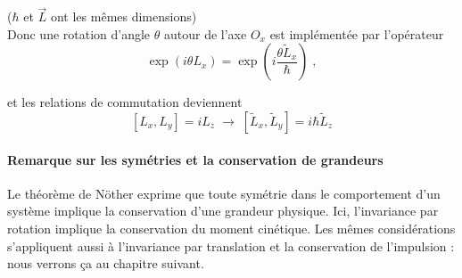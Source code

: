 \documentclass[../notesdecours.tex]{subfiles}
\begin{document}
($\hbar$ et $\vec L$ ont les mêmes dimensions) \\

Donc une rotation d'angle $\theta$ autour de l'axe $O_x$ est implémentée par l'opérateur $$\exp(i\theta L_x)  = \exp\left(i\dfrac{\theta \tilde{L}_x}{\hbar}\right) \; ,$$

et les relations de commutation deviennent 
$$[L_x, L_y] = i L_z \; \longrightarrow \; [\tilde{L}_x, \tilde{L}_y] = i \hbar \tilde{L}_z $$

\paragraph{Remarque sur les symétries et la conservation de grandeurs}

Le théorème de Nöther exprime que toute symétrie dans le comportement d'un système implique la conservation d'une grandeur physique. Ici, l'invariance par rotation implique la conservation du moment cinétique. Les mêmes considérations s'appliquent aussi à l'invariance par translation et la conservation de l'impulsion : nous verrons ça au chapitre suivant.
\end{document}
